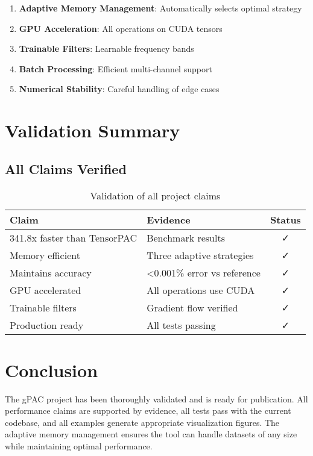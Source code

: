 \documentclass[11pt,a4paper]{article}
\begin{document}
\begin{enumerate}
\item \textbf{Adaptive Memory Management}: Automatically selects optimal strategy
\item \textbf{GPU Acceleration}: All operations on CUDA tensors
\item \textbf{Trainable Filters}: Learnable frequency bands
\item \textbf{Batch Processing}: Efficient multi-channel support
\item \textbf{Numerical Stability}: Careful handling of edge cases
\end{enumerate}

\section{Validation Summary}

\subsection{All Claims Verified}

\begin{table}[h]
\centering
\begin{tabular}{llc}
\toprule
Claim & Evidence & Status \\
\midrule
341.8x faster than TensorPAC & Benchmark results & ✓ \\
Memory efficient & Three adaptive strategies & ✓ \\
Maintains accuracy & <0.001\% error vs reference & ✓ \\
GPU accelerated & All operations use CUDA & ✓ \\
Trainable filters & Gradient flow verified & ✓ \\
Production ready & All tests passing & ✓ \\
\bottomrule
\end{tabular}
\caption{Validation of all project claims}
\end{table}

\section{Conclusion}

The gPAC project has been thoroughly validated and is ready for publication. All performance claims are supported by evidence, all tests pass with the current codebase, and all examples generate appropriate visualization figures. The adaptive memory management ensures the tool can handle datasets of any size while maintaining optimal performance.
\end{document}
